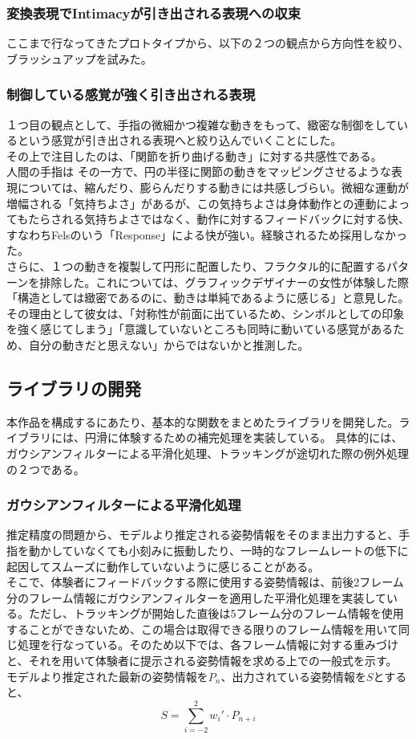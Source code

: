 \subsubsection{変換表現でIntimacyが引き出される表現への収束}
ここまで行なってきたプロトタイプから、以下の２つの観点から方向性を絞り、ブラッシュアップを試みた。
\subsubsection*{制御している感覚が強く引き出される表現}
１つ目の観点として、手指の微細かつ複雑な動きをもって、緻密な制御をしているという感覚が引き出される表現へと絞り込んでいくことにした。\\
その上で注目したのは、「関節を折り曲げる動き」に対する共感性である。\\
人間の手指は
その一方で、円の半径に関節の動きをマッピングさせるような表現については、縮んだり、膨らんだりする動きには共感しづらい。微細な運動が増幅される「気持ちよさ」があるが、この気持ちよさは身体動作との連動によってもたらされる気持ちよさではなく、動作に対するフィードバックに対する快、すなわちFelsのいう「Response」による快が強い。経験されるため採用しなかった。\\
さらに、１つの動きを複製して円形に配置したり、フラクタル的に配置するパターンを排除した。これについては、グラフィックデザイナーの女性が体験した際「構造としては緻密であるのに、動きは単純であるように感じる」と意見した。その理由として彼女は、「対称性が前面に出ているため、シンボルとしての印象を強く感じてしまう」「意識していないところも同時に動いている感覚があるため、自分の動きだと思えない」からではないかと推測した。

\subsection{ライブラリの開発}
本作品を構成するにあたり、基本的な関数をまとめたライブラリを開発した。ライブラリには、円滑に体験するための補完処理を実装している。
具体的には、ガウシアンフィルターによる平滑化処理、トラッキングが途切れた際の例外処理の２つである。

\subsubsection*{ガウシアンフィルターによる平滑化処理}
推定精度の問題から、モデルより推定される姿勢情報をそのまま出力すると、手指を動かしていなくても小刻みに振動したり、一時的なフレームレートの低下に起因してスムーズに動作していないように感じることがある。\\
そこで、体験者にフィードバックする際に使用する姿勢情報は、前後2フレーム分のフレーム情報にガウシアンフィルターを適用した平滑化処理を実装している。ただし、トラッキングが開始した直後は5フレーム分のフレーム情報を使用することができないため、この場合は取得できる限りのフレーム情報を用いて同じ処理を行なっている。そのため以下では、各フレーム情報に対する重みづけと、それを用いて体験者に提示される姿勢情報を求める上での一般式を示す。
モデルより推定された最新の姿勢情報を\(P_{n}\)、出力されている姿勢情報を\(S\)とすると、
  \begin{equation}
    S = \sum_{i=-2}^{2} w_i' \cdot P_{n+i}
    \end{equation}

